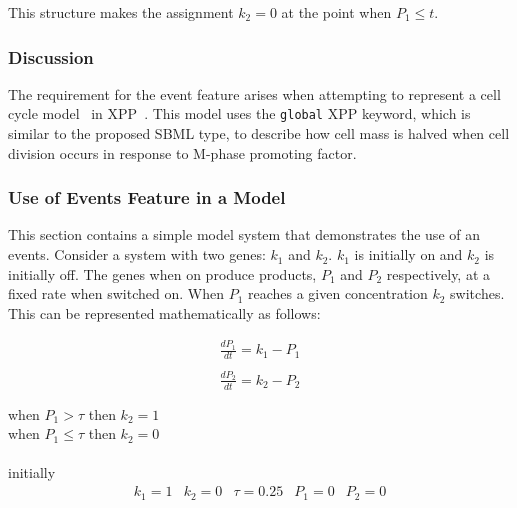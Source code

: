 \documentclass[10pt,twocolumntoc]{cekarticle}
\begin{document}
This structure makes the assignment $k_2 = 0$ at the point when
$P_1 \leq t$.

\subsubsection{Discussion}
\label{sec:eventdiscuss}
The requirement for the event feature arises when attempting to represent a cell cycle model~\citep{novak:2001} in XPP~\citep{ermentrout:2001}.  This model uses the \texttt{global} XPP keyword, which is similar to the proposed SBML  type, to describe how cell mass is halved when cell division occurs in response to M-phase promoting factor.
\subsubsection{Use of Events Feature in a Model}
\label{sec:eventeg}
This section contains a simple model system that demonstrates the
use of an events.  Consider a system with two genes: $k_1$ and
$k_2$.  $k_1$ is initially on and $k_2$ is initially off.  The
genes when on produce products, $P_1$ and $P_2$ respectively, at a
fixed rate when switched on.  When $P_1$ reaches a given
concentration $k_2$ switches.  This can be represented
mathematically as follows:

\begin{equation*}
  \begin{array}{l}
    \frac{d P_1}{d t} = k_1 - P_1\\ \\[-4pt]
    \frac{d P_2}{d t} = k_2 - P_2\\ \\[-4pt]
  \end{array}
\end{equation*}
when $P_1 > \tau$ then $k_2 = 1$ \\
when $P_1 \leq \tau$ then $k_2 = 0$ \\
\\
initially
\begin{equation*}
  \begin{array}{lllll}
    k_1 = 1 & k_2 = 0 & \tau = 0.25 & P_1 = 0 & P_2 = 0\\ \\[-4pt]
  \end{array}
\end{equation*}
\end{document}
